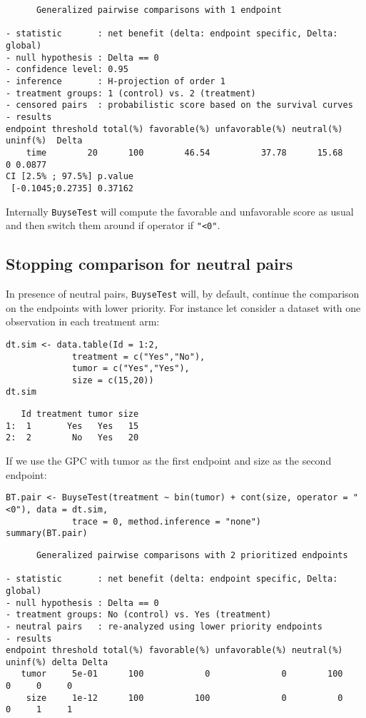\documentclass[12pt]{article}
\begin{document}
\begin{verbatim}
      Generalized pairwise comparisons with 1 endpoint

- statistic       : net benefit (delta: endpoint specific, Delta: global) 
- null hypothesis : Delta == 0 
- confidence level: 0.95 
- inference       : H-projection of order 1
- treatment groups: 1 (control) vs. 2 (treatment) 
- censored pairs  : probabilistic score based on the survival curves
- results
endpoint threshold total(%) favorable(%) unfavorable(%) neutral(%) uninf(%)  Delta
    time        20      100        46.54          37.78      15.68        0 0.0877
CI [2.5% ; 97.5%] p.value 
 [-0.1045;0.2735] 0.37162
\end{verbatim}

Internally \texttt{BuyseTest} will compute the favorable and unfavorable
score as usual and then switch them around if operator if \texttt{"<0"}.

\clearpage

\subsection{Stopping comparison for neutral pairs}
\label{sec:org86d0175}
In presence of neutral pairs, \texttt{BuyseTest} will, by default, continue
the comparison on the endpoints with lower priority. For instance let
consider a dataset with one observation in each treatment arm:
\lstset{language=r,label= ,caption= ,captionpos=b,numbers=none}
\begin{lstlisting}
dt.sim <- data.table(Id = 1:2,
		     treatment = c("Yes","No"),
		     tumor = c("Yes","Yes"),
		     size = c(15,20))
dt.sim
\end{lstlisting}

\begin{verbatim}
   Id treatment tumor size
1:  1       Yes   Yes   15
2:  2        No   Yes   20
\end{verbatim}

\bigskip

If we use the GPC with tumor as the first endpoint and size as the
second endpoint:
\lstset{language=r,label= ,caption= ,captionpos=b,numbers=none}
\begin{lstlisting}
BT.pair <- BuyseTest(treatment ~ bin(tumor) + cont(size, operator = "<0"), data = dt.sim,
		     trace = 0, method.inference = "none")
summary(BT.pair)
\end{lstlisting}

\begin{verbatim}
      Generalized pairwise comparisons with 2 prioritized endpoints

- statistic       : net benefit (delta: endpoint specific, Delta: global) 
- null hypothesis : Delta == 0 
- treatment groups: No (control) vs. Yes (treatment) 
- neutral pairs   : re-analyzed using lower priority endpoints
- results
endpoint threshold total(%) favorable(%) unfavorable(%) neutral(%) uninf(%) delta Delta
   tumor     5e-01      100            0              0        100        0     0     0
    size     1e-12      100          100              0          0        0     1     1
\end{verbatim}
\end{document}
